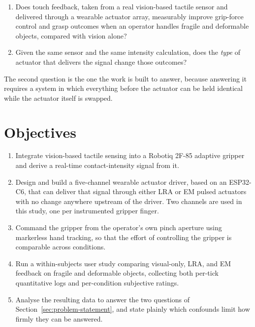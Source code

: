 \documentclass[12pt, a4paper, twoside, openright]{report}
\begin{document}
\begin{enumerate}[label=(\roman*)]
    \item Does touch feedback, taken from a real vision-based tactile sensor
          and delivered through a wearable actuator array, measurably improve
          grip-force control and grasp outcomes when an operator handles
          fragile and deformable objects, compared with vision alone?
    \item Given the same sensor and the same intensity calculation, does the
          \emph{type} of actuator that delivers the signal change those
          outcomes?
\end{enumerate}

The second question is the one the work is built to answer, because answering
it requires a system in which everything before the actuator can be held
identical while the actuator itself is swapped.

\section{Objectives}
\label{sec:objectives}

\begin{enumerate}
    \item Integrate vision-based tactile sensing into a Robotiq 2F-85 adaptive
          gripper and derive a real-time contact-intensity signal from it.
    \item Design and build a five-channel wearable actuator driver, based on an
          ESP32-C6, that can deliver that signal through either LRA or EM
          pulsed actuators with no change anywhere upstream of the
          driver. Two channels are used in this study, one per instrumented
          gripper finger.
    \item Command the gripper from the operator's own pinch aperture using
          markerless hand tracking, so that the effort of controlling the
          gripper is comparable across conditions.
    \item Run a within-subjects user study comparing visual-only, LRA, and EM
          feedback on fragile and deformable objects, collecting both per-tick
          quantitative logs and per-condition subjective ratings.
    \item Analyse the resulting data to answer the two questions of
          Section~\ref{sec:problem-statement}, and state plainly which
          confounds limit how firmly they can be answered.
\end{enumerate}
\end{document}
